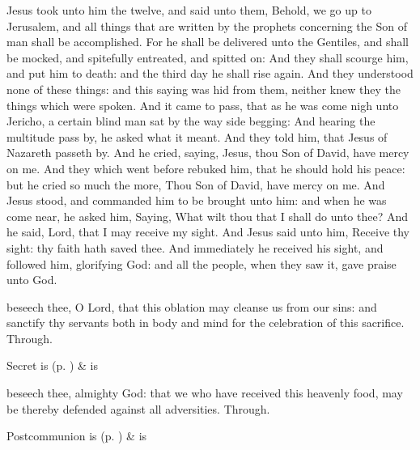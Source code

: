  Jesus took unto him the twelve, and said unto them, Behold, we go up to Jerusalem, and all things that are written by the prophets concerning the Son of man shall be accomplished. For he shall be delivered unto the Gentiles, and shall be mocked, and spitefully entreated, and spitted on: And they shall scourge him, and put him to death: and the third day he shall rise again. And they understood none of these things: and this saying was hid from them, neither knew they the things which were spoken. And it came to pass, that as he was come nigh unto Jericho, a certain blind man sat by the way side begging: And hearing the multitude pass by, he asked what it meant. And they told him, that Jesus of Nazareth passeth by. And he cried, saying, Jesus, thou Son of David, have mercy on me. And they which went before rebuked him, that he should hold his peace: but he cried so much the more, Thou Son of David, have mercy on me. And Jesus stood, and commanded him to be brought unto him: and when he was come near, he asked him, Saying, What wilt thou that I shall do unto thee? And he said, Lord, that I may receive my sight. And Jesus said unto him, Receive thy sight: thy faith hath saved thee. And immediately he received his sight, and followed him, glorifying God: and all the people, when they saw it, gave praise unto God.


\secret
{} beseech thee, O Lord, that this oblation may cleanse us from our sins: and sanctify thy servants both in body and mind for the celebration of this sacrifice. Through.
\begin{rubric}
     Secret is  (p. \pageref{SPSaints}) \&  is 
\end{rubric}


\postcommunion
{} beseech thee, almighty God: that we who have received this heavenly food, may be thereby defended against all adversities. Through.


\begin{rubric}
     Postcommunion is  (p. \pageref{SPSaints}) \&  is 
\end{rubric}


